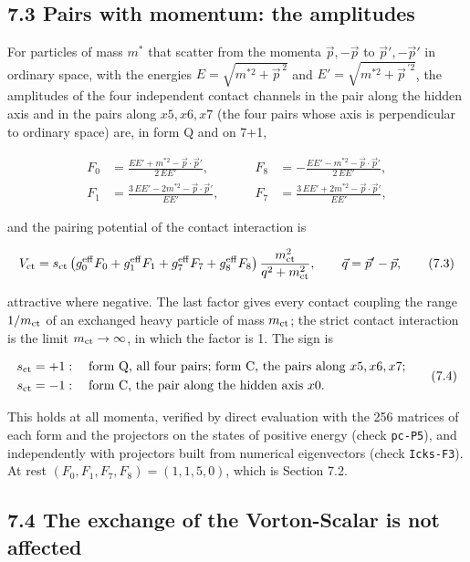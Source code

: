 \documentclass[
  10pt,
]{article}
\begin{document}
\hypertarget{pairs-with-momentum-the-amplitudes}{%
\subsection{7.3 Pairs with momentum: the
amplitudes}\label{pairs-with-momentum-the-amplitudes}}

For particles of mass \(m^*\) that scatter from the momenta
\(\vec p,-\vec p\) to \(\vec p',-\vec p'\) in ordinary space, with the
energies \(E=\sqrt{m^{*2}+\vec p^{\,2}}\) and
\(E'=\sqrt{m^{*2}+\vec p^{\,\prime2}}\), the amplitudes of the four
independent contact channels in the pair along the hidden axis and in
the pairs along \(x5,x6,x7\) (the four pairs whose axis is perpendicular
to ordinary space) are, in form Q and on 7+1,

\[\begin{aligned}
F_0&=\frac{EE'+m^{*2}-\vec p\cdot\vec p'}{2\,EE'},&\qquad F_8&=-\frac{EE'-m^{*2}-\vec p\cdot\vec p'}{2\,EE'},\\
F_1&=\frac{3\,EE'-2m^{*2}-\vec p\cdot\vec p'}{EE'},&\qquad F_7&=\frac{3\,EE'+2m^{*2}-\vec p\cdot\vec p'}{EE'},
\end{aligned}\tag{7.2}\]

and the pairing potential of the contact interaction is

\[V_{\rm ct}=s_{\rm ct}\,\big(g_0^{\rm eff}F_0+g_1^{\rm eff}F_1+g_7^{\rm eff}F_7+g_8^{\rm eff}F_8\big)\,\frac{m_{\rm ct}^2}{q^2+m_{\rm ct}^2},\qquad\vec q=\vec p'-\vec p,\tag{7.3}\]

attractive where negative. The last factor gives every contact coupling
the range \(1/m_{\rm ct}\) of an exchanged heavy particle of mass
\(m_{\rm ct}\); the strict contact interaction is the limit
\(m_{\rm ct}\to\infty\), in which the factor is 1. The sign is

\[\begin{aligned}
s_{\rm ct}&=+1:\quad\text{form Q, all four pairs; form C, the pairs along }x5,x6,x7;\\
s_{\rm ct}&=-1:\quad\text{form C, the pair along the hidden axis }x0.
\end{aligned}\tag{7.4}\]

This holds at all momenta, verified by direct evaluation with the 256
matrices of each form and the projectors on the states of positive
energy (check \texttt{pc-P5}), and independently with projectors built
from numerical eigenvectors (check \texttt{Icks-F3}). At rest
\((F_0,F_1,F_7,F_8)=(1,1,5,0)\), which is Section 7.2.

\hypertarget{the-exchange-of-the-vorton-scalar-is-not-affected}{%
\subsection{7.4 The exchange of the Vorton-Scalar is not
affected}\label{the-exchange-of-the-vorton-scalar-is-not-affected}}
\end{document}
